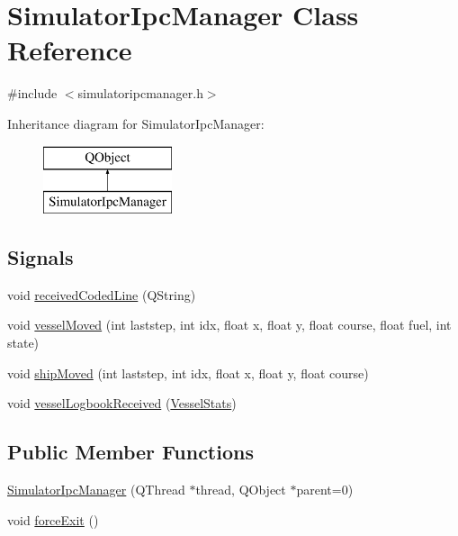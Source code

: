 \hypertarget{class_simulator_ipc_manager}{}\section{Simulator\+Ipc\+Manager Class Reference}
\label{class_simulator_ipc_manager}


{\ttfamily \#include $<$simulatoripcmanager.\+h$>$}

Inheritance diagram for Simulator\+Ipc\+Manager\+:\begin{figure}[H]
\begin{center}
\leavevmode
\includegraphics[height=2.000000cm]{df/d0b/class_simulator_ipc_manager}
\end{center}
\end{figure}
\subsection*{Signals}
\begin{DoxyCompactItemize}
\item 
void \mbox{\hyperlink{class_simulator_ipc_manager_a806046f2e643daee3be9a9a40392b245}{received\+Coded\+Line}} (Q\+String)
\item 
void \mbox{\hyperlink{class_simulator_ipc_manager_a1cb0cc4a00ce9b3db4ddfc218e78486a}{vessel\+Moved}} (int laststep, int idx, float x, float y, float course, float fuel, int state)
\item 
void \mbox{\hyperlink{class_simulator_ipc_manager_a68341f7f6daa4c81f1479ce1a03da5f8}{ship\+Moved}} (int laststep, int idx, float x, float y, float course)
\item 
void \mbox{\hyperlink{class_simulator_ipc_manager_ae4fa10519f329a23a6f7c92d03fa025c}{vessel\+Logbook\+Received}} (\mbox{\hyperlink{class_vessel_stats}{Vessel\+Stats}})
\end{DoxyCompactItemize}
\subsection*{Public Member Functions}
\begin{DoxyCompactItemize}
\item 
\mbox{\hyperlink{class_simulator_ipc_manager_a92985d9a50cd120f06b12659e8f773f7}{Simulator\+Ipc\+Manager}} (Q\+Thread $\ast$thread, Q\+Object $\ast$parent=0)
\item 
void \mbox{\hyperlink{class_simulator_ipc_manager_ae924508d5f2da56186f50cf3dc1eec63}{force\+Exit}} ()
\end{DoxyCompactItemize}


